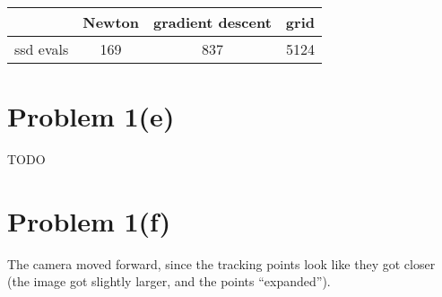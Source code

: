 \documentclass{article}
\begin{document}
\begin{center}
\begin{tabular}{ ||c|c|c|c|| } 
	\hline
				& Newton & gradient descent & grid \\ \hline
	ssd evals 	& 169 & 837 & 5124\\

\hline
\end{tabular}
\end{center}

\section*{Problem 1(e)}

TODO

\section*{Problem 1(f)}

The camera moved forward, since the tracking points look like they got closer (the image got slightly larger, and the points ``expanded'').
\end{document}

